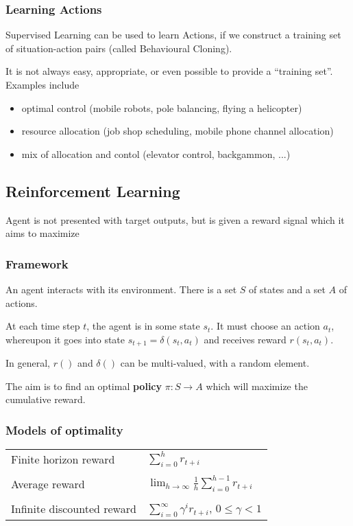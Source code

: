 \subsubsection{Learning Actions}
Supervised Learning can be used to learn Actions, if we construct a training
set of situation-action pairs (called Behavioural Cloning).

It is not always easy, appropriate, or even possible to provide a ``training
set''. Examples include
\begin{itemize}
    \item optimal control (mobile robots, pole balancing, flying a helicopter)
    \item resource allocation (job shop scheduling, mobile phone channel
        allocation)
    \item mix of allocation and contol (elevator control, backgammon, ...)
\end{itemize}

\subsection{Reinforcement Learning}
Agent is not presented with target outputs, but is given a reward signal which
it aims to maximize

\subsubsection{Framework}
An agent interacts with its environment. There is a set $S$ of states and a set
$A$ of actions.

At each time step $t$, the agent is in some state $s_t$. It must choose an
action $a_t$, whereupon it goes into state $s_{t+1} = \delta(s_t, a_t)$ and
receives reward $r(s_t, a_t)$.

In general, $r()$ and $\delta()$ can be multi-valued, with a random element.

The aim is to find an optimal \textbf{policy} $\pi : S \rightarrow A$ which
will maximize the cumulative reward.

\subsubsection{Models of optimality}

\begin{tabular}{l l}
    Finite horizon reward      & $\sum_{i = 0}^h r_{t+i}$\\\\
    Average reward             & $\lim_{h \rightarrow \infty} \frac{1}{h} \sum_{i = 0}^{h-1} r_{t+i}$\\\\
    Infinite discounted reward & $\sum_{i = 0}^{\infty} \gamma^i r_{t+i}$, $0 \leq \gamma < 1$
\end{tabular}

